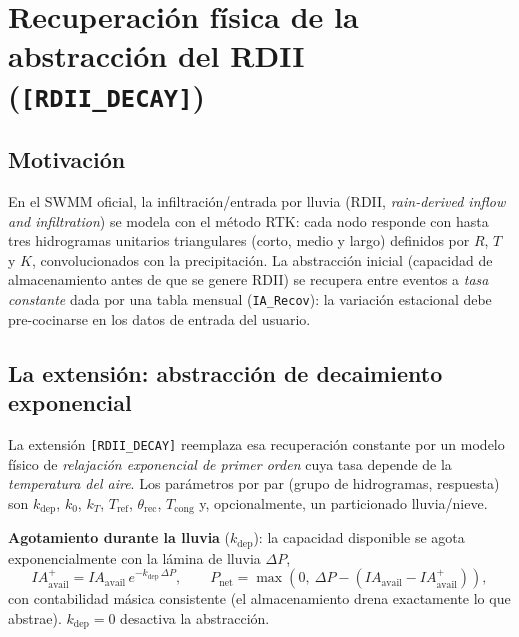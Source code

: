 \documentclass[11pt,a4paper]{article}
\begin{document}
\section{Recuperación física de la abstracción del RDII (\texttt{[RDII\_DECAY]})}

\subsection{Motivación}

En el SWMM oficial, la infiltración/entrada por lluvia (RDII, \emph{rain-derived
inflow and infiltration}) se modela con el método RTK: cada nodo responde con
hasta tres hidrogramas unitarios triangulares (corto, medio y largo) definidos
por $R$, $T$ y $K$, convolucionados con la precipitación. La abstracción
inicial (capacidad de almacenamiento antes de que se genere RDII) se recupera
entre eventos a \emph{tasa constante} dada por una tabla mensual
(\texttt{IA\_Recov}): la variación estacional debe pre-cocinarse en los datos de
entrada del usuario.

\subsection{La extensión: abstracción de decaimiento exponencial}

La extensión \texttt{[RDII\_DECAY]} reemplaza esa recuperación constante por un
modelo físico de \emph{relajación exponencial de primer orden} cuya tasa depende
de la \emph{temperatura del aire}. Los parámetros por par (grupo de
hidrogramas, respuesta) son $k_{\mathrm{dep}}$, $k_0$, $k_T$, $T_{\mathrm{ref}}$,
$\theta_{\mathrm{rec}}$, $T_{\mathrm{cong}}$ y, opcionalmente, un particionado
lluvia/nieve.

\textbf{Agotamiento durante la lluvia} ($k_{\mathrm{dep}}$): la capacidad
disponible se agota exponencialmente con la lámina de lluvia $\Delta P$,
\begin{equation}
  IA_{\mathrm{avail}}^{+} = IA_{\mathrm{avail}}\,
    e^{-k_{\mathrm{dep}}\,\Delta P},
  \qquad
  P_{\mathrm{net}} = \max\!\left(0,\ \Delta P -
    \left(IA_{\mathrm{avail}} - IA_{\mathrm{avail}}^{+}\right)\right),
\end{equation}
con contabilidad másica consistente (el almacenamiento drena exactamente lo
que abstrae). $k_{\mathrm{dep}} = 0$ desactiva la abstracción.
\end{document}
